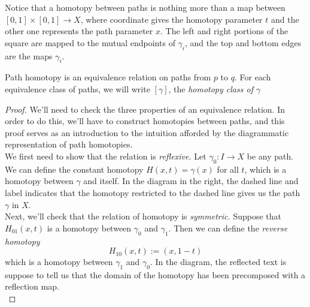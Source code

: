 \begin{doubledtuftepage}
{}
Notice that a homotopy between paths is nothing more than a map between $[0,1]\times [0,1]\to X$, where coordinate gives the homotopy parameter $t$ and the other one represents the path parameter $x$. The left and right portions of the square are mapped to the mutual endpoints of $\gamma_i$, and the top and bottom edges are the maps $\gamma_i$. \\

\begin{claim}
	Path homotopy is an equivalence relation on paths from $p$ to $q$. For each equivalence class of paths, we will write $[\gamma]$, the \emph{homotopy class of $\gamma$}
\end{claim}
\begin{proof}
We'll need to check the three properties of an equivalence relation. In order to do this, we'll have to construct homotopies between paths, and this proof serves as an introduction to the intuition afforded by the diagrammatic representation of path homotopies. \\
We first need to show that the relation is \emph{reflexive.}
Let $\gamma_0: I\to X$ be any path. We can define the constant homotopy $H(x,  t)=\gamma(x)$ for all $t$, which is a homotopy between $\gamma$ and itself. In the diagram in the right, the dashed line and label indicates that the homotopy restricted to the dashed line gives us the path $\gamma$ in $X$.  \\

Next, we'll check that the relation of homotopy is \emph{symmetric.}  Suppose that $H_{01}(x,  t)$ is a homotopy between $\gamma_0$ and $\gamma_1$. Then we can define the \emph{reverse homotopy} \[H_{10}(x, t):=(x, 1-t)\] which is a homotopy between $\gamma_1$ and $\gamma_0$. In the diagram, the reflected text is suppose to tell us that the domain of the homotopy has been precomposed with a reflection map. \\


\end{proof}
\end{doubledtuftepage}
